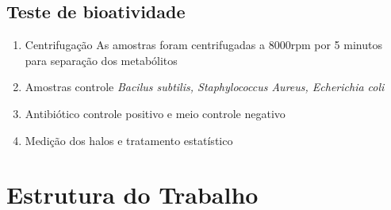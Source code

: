 \subsection{Teste de bioatividade}

\begin{enumerate}
    \item Centrifugação%
    As amostras foram centrifugadas a 8000rpm por 5 minutos para separação dos metabólitos
    \item Amostras controle%
    \textit{Bacilus subtilis, Staphylococcus Aureus, Echerichia coli}
    \item Antibiótico controle positivo e meio controle negativo%
    \item Medição dos halos e tratamento estatístico
\end{enumerate}



\section{Estrutura do Trabalho}



